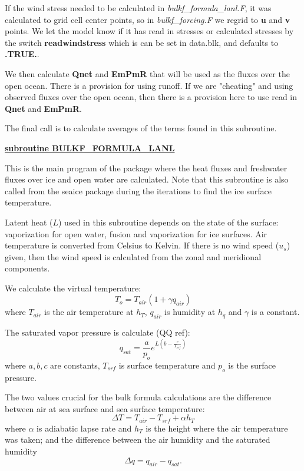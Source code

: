 If the wind stress needed to be calculated in {\it bulkf\_formula\_lanl.F},
it was calculated to grid cell center points, so in {\it bulkf\_forcing.F}
we regrid to {\bf u} and {\bf v} points. We let the model know
if it has read in stresses or calculated stresses by the switch
{\bf readwindstress} which is can be set in data.blk, and defaults
to {\bf .TRUE.}.

We then calculate {\bf Qnet} and {\bf EmPmR} that will be used
as the fluxes over the open ocean. There is a provision for
using runoff. If we are "cheating" and using observed fluxes 
over the open ocean, then there is a provision here to
use read in {\bf Qnet} and {\bf EmPmR}.

The final call is to calculate averages of the terms found
in this subroutine.

\vspace{1cm}
\noindent
{\bf {\underline{ subroutine BULKF\_FORMULA\_LANL}}}

\noindent
This is the main program of the package where the
heat fluxes and freshwater fluxes over ice and
open water are calculated. Note that this subroutine
is also called from the seaice package during the
iterations to find the ice surface temperature.

Latent heat ($L$) used in this subroutine 
depends on the state of the surface: vaporization for
open water, fusion and vaporization for ice surfaces.
Air temperature is converted from Celsius to Kelvin.
If there is no wind speed ($u_s$) given, then the wind speed
is calculated from the zonal and meridional components.

We calculate the virtual temperature:
\[
T_o = T_{air} (1+\gamma q_{air})
\]
where $T_{air}$ is the air temperature at $h_T$, $q_{air}$ is
humidity at $h_q$ and $\gamma$ is a constant.

The saturated vapor pressure is calculate (QQ ref):
\[
q_{sat} = \frac{a}{p_o} e^{L (b-\frac{c}{T_{srf}})}
\]
where $a,b,c$ are constants, $T_{srf}$ is surface temperature
and $p_o$ is the surface pressure.

The two values crucial for the bulk formula calculations are
the difference between air at sea surface and sea surface temperature:
\[
\Delta T = T_{air} - T_{srf} +\alpha h_T
\]
where $\alpha$ is adiabatic lapse rate and $h_T$ is the  height
where the air temperature was taken; and the difference
between the air humidity and the saturated humidity
\[
\Delta q = q_{air} - q_{sat}.
\]

